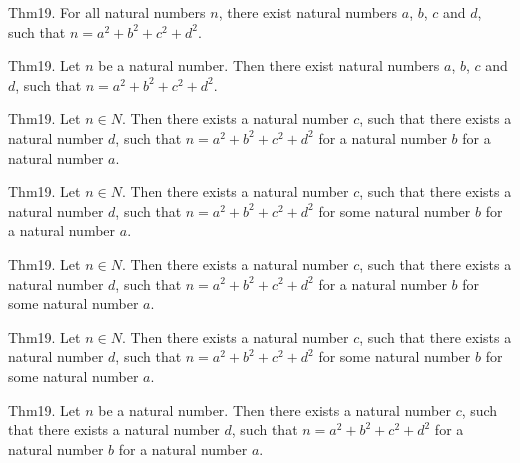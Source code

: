 \documentclass{article}
\begin{document}
Thm19. For all natural numbers $n$, there exist natural numbers $a$, $b$, $c$ and $d$, such that $n = a ^{ 2}+ b ^{ 2}+ c ^{ 2}+ d ^{ 2}$.

Thm19. Let $n$ be a natural number. Then there exist natural numbers $a$, $b$, $c$ and $d$, such that $n = a ^{ 2}+ b ^{ 2}+ c ^{ 2}+ d ^{ 2}$.

Thm19. Let $n \in N$. Then there exists a natural number $c$, such that there exists a natural number $d$, such that $n = a ^{ 2}+ b ^{ 2}+ c ^{ 2}+ d ^{ 2}$ for a natural number $b$ for a natural number $a$.

Thm19. Let $n \in N$. Then there exists a natural number $c$, such that there exists a natural number $d$, such that $n = a ^{ 2}+ b ^{ 2}+ c ^{ 2}+ d ^{ 2}$ for some natural number $b$ for a natural number $a$.

Thm19. Let $n \in N$. Then there exists a natural number $c$, such that there exists a natural number $d$, such that $n = a ^{ 2}+ b ^{ 2}+ c ^{ 2}+ d ^{ 2}$ for a natural number $b$ for some natural number $a$.

Thm19. Let $n \in N$. Then there exists a natural number $c$, such that there exists a natural number $d$, such that $n = a ^{ 2}+ b ^{ 2}+ c ^{ 2}+ d ^{ 2}$ for some natural number $b$ for some natural number $a$.

Thm19. Let $n$ be a natural number. Then there exists a natural number $c$, such that there exists a natural number $d$, such that $n = a ^{ 2}+ b ^{ 2}+ c ^{ 2}+ d ^{ 2}$ for a natural number $b$ for a natural number $a$.
\end{document}

